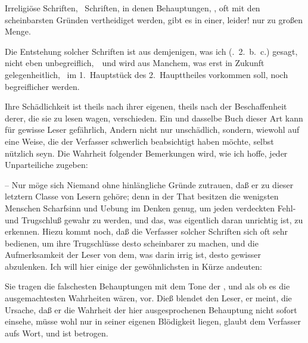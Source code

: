 \begin{aufza}
\item Irreligiöse Schriften, \dh\ Schriften, in denen Behauptungen, , oft mit den scheinbarsten Gründen vertheidiget werden, gibt es in einer, leider! nur zu großen Menge.
\item Die Entstehung solcher Schriften ist aus demjenigen, was ich (.~2.~b.~c.) gesagt, nicht eben unbegreiflich,~\ und wird aus Manchem, was erst in Zukunft gelegenheitlich, \zB\ im 1.~Hauptstück des 2.~Haupttheiles vorkommen soll, noch begreiflicher werden.
\item Ihre Schädlichkeit ist theils nach ihrer eigenen, theils nach der Beschaffenheit derer, die sie zu lesen wagen, verschieden. Ein und dasselbe Buch dieser Art kann für gewisse Leser gefährlich, Andern nicht nur unschädlich, sondern, wiewohl auf eine Weise, die der Verfasser schwerlich beabsichtigt haben möchte, selbst nützlich seyn. Die Wahrheit folgender Bemerkungen wird, wie ich hoffe, jeder Unparteiliche zugeben:
\begin{aufzb} 
\item {} -- Nur möge sich Niemand ohne hinlängliche Gründe zutrauen, daß er zu dieser letztern Classe von Lesern gehöre; denn in der That besitzen die wenigsten Menschen Scharfsinn und Uebung im Denken genug, um jeden verdeckten Fehl- und Trugschluß gewahr zu werden, und das, was eigentlich daran unrichtig ist, zu erkennen. Hiezu kommt noch, daß die Verfasser solcher Schriften sich oft sehr  bedienen, um ihre Trugschlüsse desto scheinbarer zu machen, und die Aufmerksamkeit der Leser von dem, was darin irrig ist, desto gewisser abzulenken. Ich will hier einige der gewöhnlichsten in Kürze andeuten:
\begin{aufzc}
\item Sie tragen die falschesten Behauptungen mit dem Tone der , und als ob es die ausgemachtesten Wahrheiten wären, vor.
Dieß blendet den Leser, er meint, die Ursache, daß er die Wahrheit der hier ausgesprochenen Behauptung nicht sofort einsehe, müsse wohl nur in seiner eigenen Blödigkeit liegen, glaubt dem Verfasser aufs Wort, und ist betrogen.~

\end{aufzc}
\end{aufzb}
\end{aufza}
